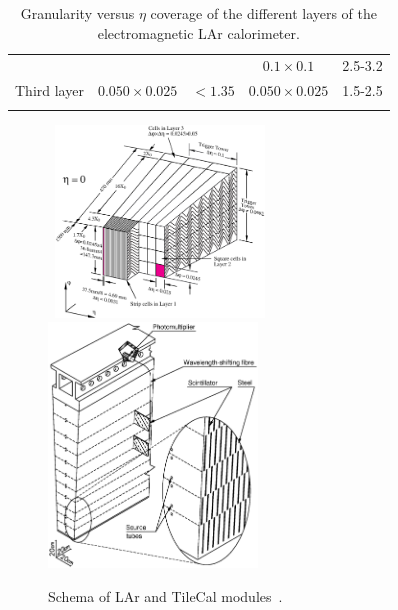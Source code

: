 \begin{table}[!ht]
\begin{center}
\begin{small}
\begin{tabular*}{\textwidth}{@{\extracolsep{\fill}}ccccc}
                                     &                                &          &  $0.1\times0.1$              & 2.5-3.2 \\
        \noalign{\smallskip}\hline\noalign{\smallskip}
        Third layer   & $0.050\times0.025$             & $<1.35$  &  $0.050\times0.025$              & 1.5-2.5 \\
        \noalign{\smallskip}\hline\hline\noalign{\smallskip}
      \end{tabular*}
    \end{small}
  \end{center}
  \caption{Granularity versus $\eta$ coverage of the different layers of the electromagnetic LAr calorimeter.}
  \label{tab:LArGranularity}
\end{table}

\begin{figure}[!ht]
  \begin{center}
    \mbox{
      \includegraphics[width=0.495\textwidth]{ATLASdetector/Figures/LAr_Module.eps}
      \includegraphics[width=0.495\textwidth]{ATLASdetector/Figures/TileCal_Module.eps}
    }
  \end{center}
  \caption[Schema of LAr and TileCal modules.]{Schema of LAr and TileCal modules~\cite{Aad:2010ai,Aad:2010af}.}
  \label{fig:CalorimeterModules}
\end{figure}

